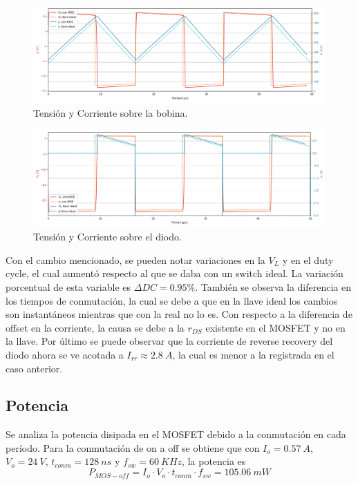 \begin{multicols}{2}
\begin{figure}[H]
	\centering
	\includegraphics[width=\linewidth]{ImagenesEjercicio-3/il-vl-2v3}
	\caption{Tensión y Corriente sobre la bobina.}
	\label{fig:ej3:Il_Vl}
\end{figure}
\begin{figure}[H]
	\centering
	\includegraphics[width=\linewidth]{ImagenesEjercicio-3/id-vd-2v3}
	\caption{Tensión y Corriente sobre el diodo.}
	\label{fig:ej3:Id_Vd}
\end{figure}
\end{multicols}

Con el cambio mencionado, se pueden notar variaciones en la $V_L$ y en el duty cycle, el cual aumentó respecto al que se daba con un switch ideal. La variación porcentual de esta variable es $\Delta DC = 0.95 \% $. También se observa la diferencia en los tiempos de conmutación, la cual se debe a que en la llave ideal los cambios son instantáneos mientras que con la real no lo es. Con respecto a la diferencia de offset en la corriente, la causa se debe a la $r_{DS}$ existente en el MOSFET y no en la llave. Por último se puede observar que la corriente de reverse recovery del diodo ahora se ve acotada a $I_{rr}\approx 2.8 \ A$, la cual es menor a la registrada en el caso anterior.

\subsection{Potencia}
Se analiza la potencia disipada en el MOSFET debido a la conmutación en cada período.
Para la conmutación de on a off se obtiene que con $I_o = 0.57 \ A$, $V_o = 24 \ V$, $t_{conm}= 128 \ ns$ y $f_{sw}=60 \ KHz$, la potencia es
\begin{equation}
P_{MOS-off}=I_o \cdot V_o \cdot t_{conm} \cdot f_{sw} = 105.06 \ mW
\end{equation}

